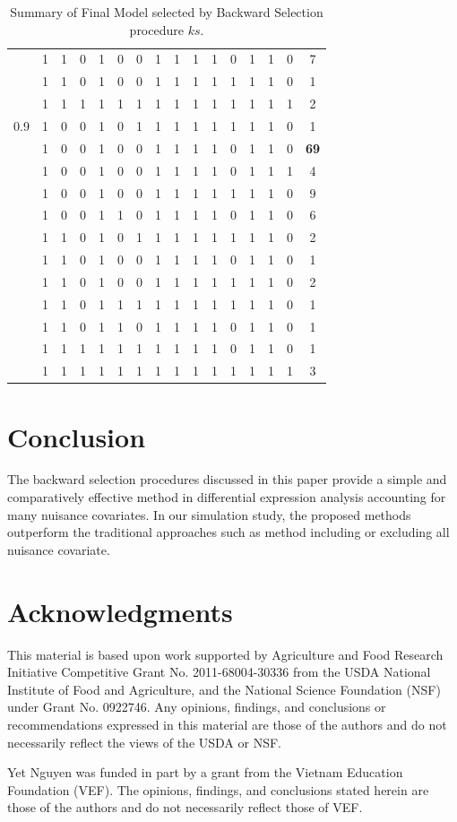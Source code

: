 \documentclass[12pt, letter]{article}\usepackage[]{graphicx}\usepackage[]{color}
\begin{document}
\begin{table}[ht]
{\begin{tabular}{|c|c|c|c|c|c|c|c|c|c|c|c|c|c|c|c|}
   & 1 & 1 & 0 & 1 & 0 & 0 & 1 & 1 & 1 & 1 & 0 & 1 & 1 & 0 & 7 \\ 
   & 1 & 1 & 0 & 1 & 0 & 0 & 1 & 1 & 1 & 1 & 1 & 1 & 1 & 0 & 1 \\ 
   & 1 & 1 & 1 & 1 & 1 & 1 & 1 & 1 & 1 & 1 & 1 & 1 & 1 & 1 & 2 \\ 
   \hline
0.9 & 1 & 0 & 0 & 1 & 0 & 1 & 1 & 1 & 1 & 1 & 1 & 1 & 1 & 0 & 1 \\ 
   & 1 & 0 & 0 & 1 & 0 & 0 & 1 & 1 & 1 & 1 & 0 & 1 & 1 & 0 & \textbf{69} \\ 
   & 1 & 0 & 0 & 1 & 0 & 0 & 1 & 1 & 1 & 1 & 0 & 1 & 1 & 1 & 4 \\ 
   & 1 & 0 & 0 & 1 & 0 & 0 & 1 & 1 & 1 & 1 & 1 & 1 & 1 & 0 & 9 \\ 
   & 1 & 0 & 0 & 1 & 1 & 0 & 1 & 1 & 1 & 1 & 0 & 1 & 1 & 0 & 6 \\ 
   & 1 & 1 & 0 & 1 & 0 & 1 & 1 & 1 & 1 & 1 & 1 & 1 & 1 & 0 & 2 \\ 
   & 1 & 1 & 0 & 1 & 0 & 0 & 1 & 1 & 1 & 1 & 0 & 1 & 1 & 0 & 1 \\ 
   & 1 & 1 & 0 & 1 & 0 & 0 & 1 & 1 & 1 & 1 & 1 & 1 & 1 & 0 & 2 \\ 
   & 1 & 1 & 0 & 1 & 1 & 1 & 1 & 1 & 1 & 1 & 1 & 1 & 1 & 0 & 1 \\ 
   & 1 & 1 & 0 & 1 & 1 & 0 & 1 & 1 & 1 & 1 & 0 & 1 & 1 & 0 & 1 \\ 
   & 1 & 1 & 1 & 1 & 1 & 1 & 1 & 1 & 1 & 1 & 0 & 1 & 1 & 0 & 1 \\ 
   & 1 & 1 & 1 & 1 & 1 & 1 & 1 & 1 & 1 & 1 & 1 & 1 & 1 & 1 & 3 \\ 
   \hline
\end{tabular}
}
\caption{Summary of Final Model selected by Backward Selection procedure $ks$.} 
\label{simks}
\end{table}
\newpage
\section{ Conclusion}
The backward selection procedures discussed in this paper provide a simple and comparatively effective method in differential expression analysis accounting for many nuisance covariates. In our simulation study, the proposed methods outperform the traditional approaches such as method including or excluding all nuisance covariate. 


\section*{ Acknowledgments}
This material is based upon work supported by Agriculture and Food
Research Initiative Competitive Grant No. 2011-68004-30336 from
the USDA National Institute of Food and Agriculture, and the
National Science Foundation (NSF) under Grant No. 0922746.
Any opinions, findings, and conclusions or recommendations expressed in this material are those of the authors and do not necessarily reflect the views of the USDA or NSF.

Yet Nguyen was funded in part by a grant from the Vietnam Education Foundation (VEF). The opinions, findings, and conclusions stated herein are those of the authors and do not necessarily reflect those of VEF.




\end{document}
